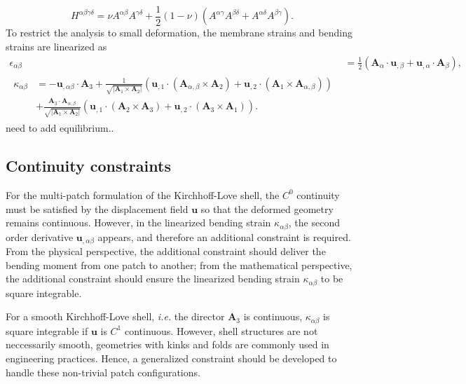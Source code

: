 \documentclass[preprint,12pt]{elsarticle}
\theoremstyle{remark}
\begin{document}
\begin{equation}
    H^{\alpha\beta\gamma\delta} = \nu A^{\alpha\beta}A^{\gamma\delta} + \frac{1}{2}(1-\nu)\left({A^{\alpha\gamma}A^{\beta\delta}+A^{\alpha\delta}A^{\beta\gamma}}\right).
\end{equation}
To restrict the analysis to small deformation, the membrane strains and bending strains are linearized as
\begin{align}
    \epsilon_{\alpha \beta} &= \frac{1}{2}\left({\mathbf{A}_{\alpha}\cdot{}\mathbf{u}_{,\beta}+\mathbf{u}_{,\alpha}\cdot\mathbf{A}_{\beta}}\right),\label{eq:membrane_strain}\\
    \begin{split}
    \kappa_{\alpha \beta} &= -\mathbf{u}_{,\alpha\beta}\cdot\mathbf{A}_3+\frac{1}{\sqrt{\vert\mathbf{A}_1\times\mathbf{A}_2\vert}}\left({\mathbf{u}_{,1}\cdot\left({\mathbf{A}_{\alpha,\beta}\times\mathbf{A}_{2}}\right)+\mathbf{u}_{,2}\cdot\left({\mathbf{A}_{1}\times\mathbf{A}_{\alpha,\beta}}\right)}\right)\\
    &+\frac{\mathbf{A}_3\cdot\mathbf{A}_{\alpha,\beta}}{\sqrt{\vert\mathbf{A}_1\times\mathbf{A}_2\vert}}\left({\mathbf{u}_{,1}\cdot\left({\mathbf{A}_{2}\times\mathbf{A}_{3}}\right)+\mathbf{u}_{,2}\cdot\left({\mathbf{A}_{3}\times\mathbf{A}_{1}}\right)}\right).
    \end{split}\label{eq:bending_strain}
\end{align}
need to add equilibrium..
\subsection{Continuity constraints}
For the multi-patch formulation of the Kirchhoff-Love shell, the $C^0$ continuity must be satisfied by the displacement field $\mathbf{u}$ so that the deformed geometry remains continuous. However, in the linearized bending strain $\kappa_{\alpha\beta}$, the second order derivative $\mathbf{u}_{,\alpha\beta}$ appears, and therefore an additional constraint is required. From the physical perspective, the additional constraint should deliver the bending moment from one patch to another; from the mathematical perspective, the additional constraint should ensure the linearized bending strain $\kappa_{\alpha\beta}$ to be square integrable. \par

For a smooth Kirchhoff-Love shell, \textit{i.e.} the director $\mathbf{A}_3$ is continuous, $\kappa_{\alpha\beta}$ is square integrable if $\mathbf{u}$ is $C^1$ continuous. However, shell structures are not neccessarily smooth, geometries with kinks and folds are commonly used in engineering practices. Hence, a generalized constraint should be developed to handle these non-trivial patch configurations.\par
\end{document}
